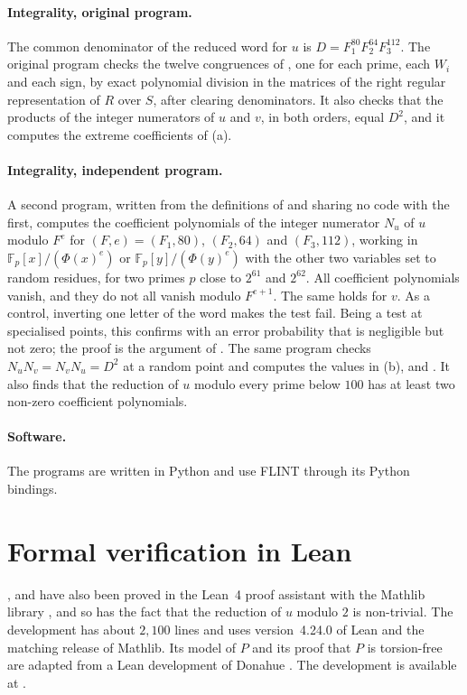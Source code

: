 \documentclass[11pt,colorlinks]{charlie}
\newcommand{\F}{\mathbb{F}}
\begin{document}
\paragraph{Integrality, original program.} The common denominator of the reduced word for $u$ is $D=F_1^{80}F_2^{64}F_3^{112}$. The original program checks the twelve congruences of , one for each prime, each $W_i$ and each sign, by exact polynomial division in the matrices of the right regular representation of $R$ over $S$, after clearing denominators. It also checks that the products of the integer numerators of $u$ and $v$, in both orders, equal $D^2$, and it computes the extreme coefficients of (a).

\paragraph{Integrality, independent program.} A second program, written from the definitions of  and sharing no code with the first, computes the coefficient polynomials of the integer numerator $N_u$ of $u$ modulo $F^e$ for $(F,e)=(F_1,80)$, $(F_2,64)$ and $(F_3,112)$, working in $\F_p[x]/(\Phi(x)^e)$ or $\F_p[y]/(\Phi(y)^e)$ with the other two variables set to random residues, for two primes $p$ close to $2^{61}$ and $2^{62}$. All coefficient polynomials vanish, and they do not all vanish modulo $F^{e+1}$. The same holds for $v$. As a control, inverting one letter of the word makes the test fail. Being a test at specialised points, this confirms  with an error probability that is negligible but not zero; the proof is the argument of . The same program checks $N_uN_v=N_vN_u=D^2$ at a random point and computes the values in (b),  and . It also finds that the reduction of $u$ modulo every prime below $100$ has at least two non-zero coefficient polynomials.

\paragraph{Software.} The programs are written in Python and use FLINT \cite{FLINT} through its Python bindings.

\section{Formal verification in Lean}\label{sec:lean}
,  and  have also been proved in the Lean~4 proof assistant \cite{Lean4} with the Mathlib library \cite{Mathlib}, and so has the fact that the reduction of $u$ modulo $2$ is non-trivial. The development has about $2{,}100$ lines and uses version~4.24.0 of Lean and the matching release of Mathlib. Its model of $P$ and its proof that $P$ is torsion-free are adapted from a Lean development of Donahue \cite{Donahue}. The development is available at \coderepo.
\end{document}

